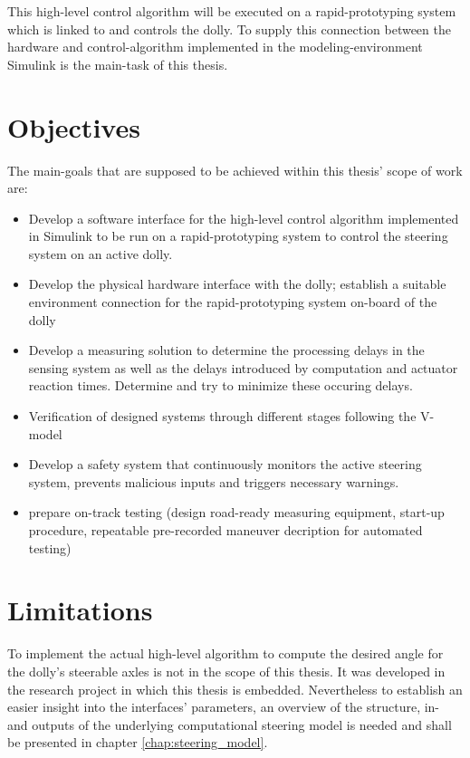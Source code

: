 \documentclass[ExampleMasters.tex]{subfiles}
\begin{document}
This high-level control algorithm will be executed on a rapid-prototyping system which is linked to and controls the dolly. To supply this connection between the hardware and control-algorithm implemented in the modeling-environment Simulink is the main-task of this thesis.    

\section{Objectives}
\label{sec:objectives}
The main-goals that are supposed to be achieved within this thesis' scope of work are: 

\begin{itemize}
	\item{Develop a software interface for the high-level control algorithm implemented in Simulink to be run on a rapid-prototyping system to control the steering system on an active dolly. }
	\item{Develop the physical hardware interface with the dolly; establish a suitable environment connection for the rapid-prototyping system on-board of the dolly} 
	\item{Develop a measuring solution to determine the processing delays in the sensing system as well as the delays introduced by computation and actuator reaction times. Determine and try to minimize these occuring delays.}  
	\item{Verification of designed systems through different stages following the V-model}
	\item{Develop a safety system that continuously monitors the active steering system, prevents malicious inputs and triggers necessary warnings.}
	\item{prepare on-track testing (design road-ready measuring equipment, start-up procedure, repeatable pre-recorded maneuver decription for automated testing)}
	
\end{itemize}



\section{Limitations}
\label{sec:limitations}
To implement the actual high-level algorithm to compute the desired angle for the dolly's steerable axles is not in the scope of this thesis. It was developed in the research project in which this thesis is embedded. Nevertheless to establish an easier insight into the interfaces' parameters, an overview of the structure, in- and outputs of the underlying computational steering model is needed and shall be presented in chapter \ref{chap:steering_model}. 
\end{document}
